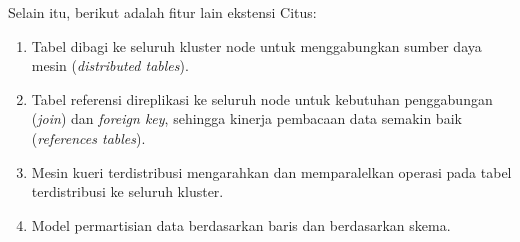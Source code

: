Selain itu, berikut adalah fitur lain ekstensi Citus:

\begin{enumerate}
    \item Tabel dibagi ke seluruh kluster node untuk menggabungkan sumber daya mesin (\textit{distributed tables}).
    \item Tabel referensi direplikasi ke seluruh node untuk kebutuhan penggabungan (\textit{join}) dan \textit{foreign key}, sehingga kinerja pembacaan data semakin baik (\textit{references tables}).
    \item Mesin kueri terdistribusi mengarahkan dan memparalelkan operasi pada tabel terdistribusi ke seluruh kluster.
    \item Model permartisian data berdasarkan baris dan berdasarkan skema.
\end{enumerate}
